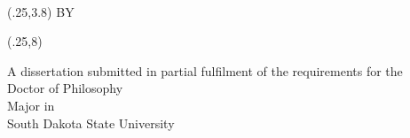 \documentclass[main.tex]{subfiles}
\begin{document}
\begin{titlepage}
\center

\yourtitle\\

\begin{textblock}{8.5}(.25,3.8)
    \centering
    BY\\[1ex]
    \yourname  
\end{textblock}

\begin{textblock}{8.5}(.25,8)
    \centering
    
    A dissertation submitted in partial fulfilment of the requirements for the\\[.9ex]
    Doctor of Philosophy\\[.9ex]
    Major in \yourmajor\\ [.9ex]
    South Dakota State University\\ [.9ex]
    \number\year
\end{textblock}

\end{titlepage}
\end{document}

